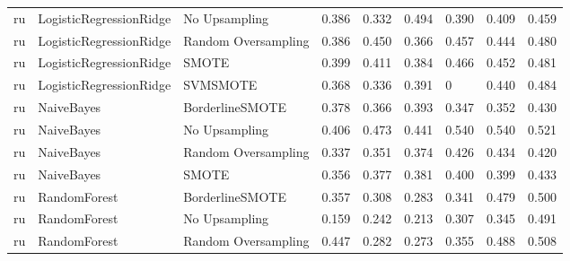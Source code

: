 \begin{tabular}{lllllllll}
      ru &      LogisticRegressionRidge &       No Upsampling & 0.386 &                     0.332 &                 0.494 &                  0.390 &                                   0.409 &     0.459 \\
      ru &      LogisticRegressionRidge & Random Oversampling & 0.386 &                     0.450 &                 0.366 &                  0.457 &                                   0.444 &     0.480 \\
      ru &      LogisticRegressionRidge &               SMOTE & 0.399 &                     0.411 &                 0.384 &                  0.466 &                                   0.452 &     0.481 \\
      ru &      LogisticRegressionRidge &            SVMSMOTE & 0.368 &                     0.336 &                 0.391 &                      0 &                                   0.440 &     0.484 \\
      ru &                   NaiveBayes &     BorderlineSMOTE & 0.378 &                     0.366 &                 0.393 &                  0.347 &                                   0.352 &     0.430 \\
      ru &                   NaiveBayes &       No Upsampling & 0.406 &                     0.473 &                 0.441 &                  0.540 &                                   0.540 &     0.521 \\
      ru &                   NaiveBayes & Random Oversampling & 0.337 &                     0.351 &                 0.374 &                  0.426 &                                   0.434 &     0.420 \\
      ru &                   NaiveBayes &               SMOTE & 0.356 &                     0.377 &                 0.381 &                  0.400 &                                   0.399 &     0.433 \\
      ru &                 RandomForest &     BorderlineSMOTE & 0.357 &                     0.308 &                 0.283 &                  0.341 &                                   0.479 &     0.500 \\
      ru &                 RandomForest &       No Upsampling & 0.159 &                     0.242 &                 0.213 &                  0.307 &                                   0.345 &     0.491 \\
      ru &                 RandomForest & Random Oversampling & 0.447 &                     0.282 &                 0.273 &                  0.355 &                                   0.488 &     0.508 \\

\end{tabular}
